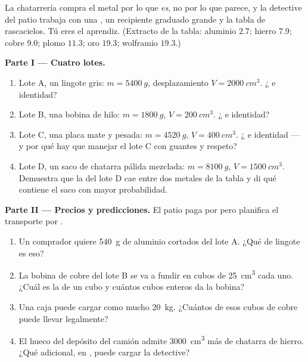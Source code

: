 \begin{problem}\label{pb:g7:volume-mass-density:1}
La chatarrería compra el metal por lo que \emph{es}, no por lo que
parece, y la detective del patio trabaja con una , un recipiente
graduado grande y la tabla de rascacielos. Tú eres el aprendiz.
(Extracto de la tabla: aluminio $2.7$; hierro $7.9$; cobre $9.0$;
plomo $11.3$; oro $19.3$; wolframio $19.3$.)

\medskip\noindent\textbf{Parte I --- Cuatro lotes.}
\begin{enumerate}
  \item Lote A, un lingote gris: $m = \qty{5400}{g}$, desplazamiento
        $V = \qty{2000}{cm^3}$. ¿ e identidad?
  \item Lote B, una bobina de hilo: $m = \qty{1800}{g}$,
        $V = \qty{200}{cm^3}$. ¿ e identidad?
  \item Lote C, una placa mate y pesada: $m = \qty{4520}{g}$,
        $V = \qty{400}{cm^3}$. ¿ e identidad --- y por qué
        hay que manejar el lote C con guantes y respeto?
  \item Lote D, un saco de chatarra pálida mezclada:
        $m = \qty{8100}{g}$, $V = \qty{1500}{cm^3}$. Demuestra que la
         del lote D cae entre dos metales de la tabla y di
        qué contiene el saco con mayor probabilidad.
\end{enumerate}

\medskip\noindent\textbf{Parte II --- Precios y predicciones.}
El patio paga por  pero planifica el transporte por
.
\begin{enumerate}[resume]
  \item Un comprador quiere \qty{540}{g} de aluminio cortados del
        lote A. ¿Qué  de lingote es eso?
  \item La bobina de cobre del lote B se va a fundir en cubos de
        \qty{25}{cm^3} cada uno. ¿Cuál es la  de un cubo y
        cuántos cubos enteros da la bobina?
  \item Una caja puede cargar como mucho \qty{20}{kg}. ¿Cuántos de
        esos cubos de cobre puede llevar legalmente?
  \item El hueco del depósito del camión admite \qty{3000}{cm^3} más
        de chatarra de hierro. ¿Qué  adicional, en
        , puede cargar la detective?
\end{enumerate}


\end{problem}
